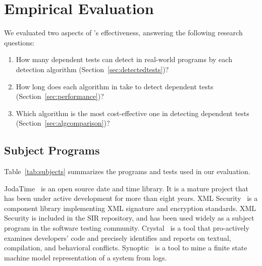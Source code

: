\section{Empirical Evaluation}
\label{sec:evaluation}



\newcommand{\jodatimetests}{3875\xspace}
\newcommand{\xmlsecuritytests}{108\xspace}
\newcommand{\crystaltests}{75\xspace}
\newcommand{\synoptictests}{118\xspace}
\newcommand{\totaltests}{4176\xspace}

\newcommand{\jodatimeautotests}{2639\xspace}
\newcommand{\xmlsecurityautotests}{665\xspace}
\newcommand{\crystalautotests}{3198\xspace}
\newcommand{\synopticautotests}{2467\xspace}
\newcommand{\totalautotests}{8969\xspace}




We evaluated two aspects of \ourtool's
effectiveness, answering the following
research questions:

\begin{enumerate}
\item How many dependent tests can \ourtool detect in
real-world programs by each detection algorithm (Section~\ref{sec:detectedtests})?
\item How long does each algorithm in \ourtool take to detect dependent
tests (Section~\ref{sec:performance})?

\item Which algorithm is the most cost-effective one in detecting
dependent tests (Section~\ref{sec:algcomparison})?
\end{enumerate}

\subsection{Subject Programs}


Table~\ref{tab:subjects} summarizes the programs and
tests used in our evaluation.

JodaTime~\cite{jodatime} is an open source
date and time library. It is a mature project that
has been under active development
for more than eight years. XML Security~\cite{xmlsecurity}
is a component library implementing XML signature and encryption
standards. XML Security is included in
the SIR repository, and has been used widely
as a subject program in the software testing community.
Crystal~\cite{crystal} is a tool that
pro-actively examines developers' code and
precisely identifies and reports on textual,
compilation, and behavioral conflicts.
Synoptic~\cite{synoptic} is a tool to mine a finite state
machine model representation of a system from logs.

